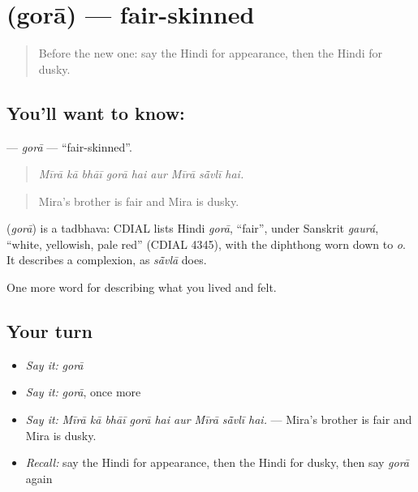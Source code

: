 \section[\texorpdfstring{\hi{गोरा} (gorā)}{गोरा (gorā)}]{ (gorā) — fair-skinned}

\label{lesson:HI-C482-gora}



\begin{quote}
Before the new one: say the Hindi for appearance, then the Hindi for dusky.
\end{quote}

\subsection*{You'll want to know: }
\textbf{} — \emph{gorā} — \textquotedblleft{}fair-skinned\textquotedblright{}.

\begin{quote}
        
\end{quote}

\begin{quote}
\emph{Mīrā kā bhāī gorā hai aur Mīrā sā̃vlī hai.}
\end{quote}

\begin{quote}
Mira's brother is fair and Mira is dusky.
\end{quote}

\begin{cousinweb}
\textbf{} (\emph{gorā}) is a tadbhava: CDIAL lists Hindi \emph{gorā}, \textquotedblleft{}fair\textquotedblright{}, under Sanskrit \emph{gaurá}, \textquotedblleft{}white, yellowish, pale red\textquotedblright{} (CDIAL 4345), with the diphthong worn down to \emph{o}. It describes a complexion, as \emph{sā̃vlā} does.
\end{cousinweb}

\begin{grammarlens}[title={What you've built}]
One more word for describing what you lived and felt.
\end{grammarlens}

\subsection*{Your turn}
\begin{itemize}
\raggedright
  \item \emph{Say it:} \emph{gorā}
  \item \emph{Say it:} \emph{gorā}, once more
  \item \emph{Say it:} \emph{Mīrā kā bhāī gorā hai aur Mīrā sā̃vlī hai.} — Mira's brother is fair and Mira is dusky.
  \item \emph{Recall:} say the Hindi for appearance, then the Hindi for dusky, then say \emph{gorā} again
\end{itemize}

